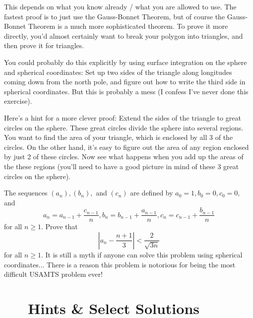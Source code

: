 \documentclass[12pt,a4paper]{memoir}
\theoremstyle{definition}
\begin{document}
\begin{solution}[name={Solution by Yenlee}]
	This depends on what you know already / what you are allowed to use. The fastest proof is to just use the Gauss-Bonnet Theorem, but of course the Gauss-Bonnet Theorem is a much more sophisticated theorem. To prove it more directly, you'd almost certainly want to break your polygon into triangles, and then prove it for triangles.
	
	You could probably do this explicitly by using surface integration on the sphere and spherical coordinates: Set up two sides of the triangle along longitudes coming down from the north pole, and figure out how to write the third side in spherical coordinates. But this is probably a mess (I confess I've never done this exercise). 
	
	Here's a hint for a more clever proof: Extend the sides of the triangle to great circles on the sphere. These great circles divide the sphere into several regions. You want to find the area of your triangle, which is enclosed by all 3 of the circles. On the other hand, it's easy to figure out the area of any region enclosed by just 2 of these circles. Now see what happens when you add up the areas of the these regions (you'll need to have a good picture in mind of these 3 great circles on the sphere).
\end{solution}




\begin{question}[name={2010 USAMTS Round III}]
	The sequences $(a_n), (b_n),$ and $(c_n)$ are defined by $a_0 = 1, b_0 = 0, c_0 = 0,$ and
	\[a_n = a_{n-1} +
	\frac{c_{n-1}}{n},  b_n = b_{n-1} +\frac{a_{n-1}}{n}, c_n = c_{n-1} +\frac{b_{n-1}}{n}\]
	for all $n \geq1$. Prove that
	\[\left|a_n -\frac{n + 1}{3}\right|<\frac{2}{\sqrt{3n}}\]
	for all $n \geq 1$. It is still a myth if anyone can solve this problem using spherical coordinates... There is a reason this problem is notorious for being the most difficult USAMTS problem ever!
\end{question}



\appendix 
\part{\ \ \ Hints \& Select Solutions}

\printsolutions
\end{document}
